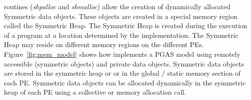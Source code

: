 \openshmem routines (\textit{shpalloc} and \textit{shmalloc}) allow the creation of dynamically allocated Symmetric
data objects. These objects are created in a special memory region
called the Symmetric Heap. The Symmetric Heap is created during the execution of a program at a location
determined by the implementation. The Symmetric Heap may reside on
different memory regions on the different \ac{PE}s. Figure~\ref{fig:mem_model} shows how \openshmem implements a \ac{PGAS} model 
using remotely accessible (symmetric objects) and private data objects. Symmetric data objects are stored in the symmetric heap or 
or in the global / static memory section of each \ac{PE}. Symmetric data objects can be allocated dynamically in the symmetric heap of each \ac{PE} using
a collective  or  memory allocation call.
     
